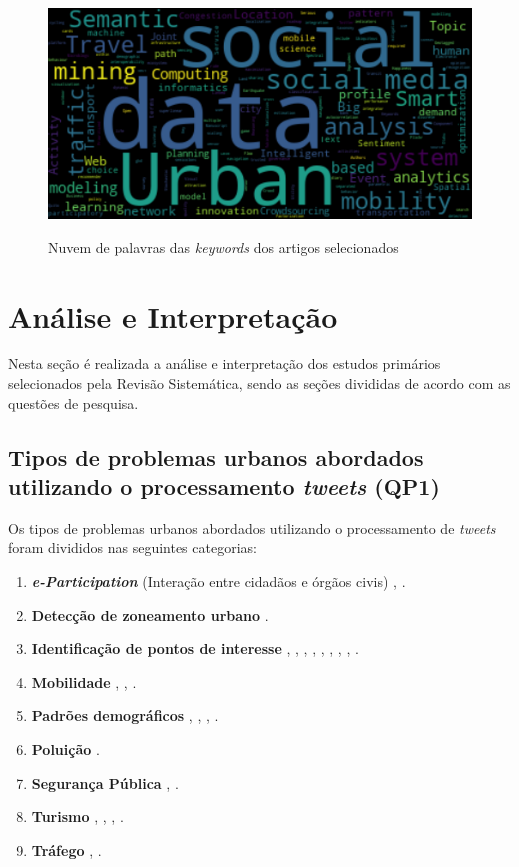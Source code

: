 \documentclass[
	12pt,				%
	oneside,			%
	a4paper,			%
	english,			%
	brazil				%
	]{abntex2ppgsi}
\begin{document}
{{\begin{figure}[H]%
	\centering
 	  \caption{Nuvem de palavras das \textit{keywords} dos artigos selecionados}
		\includegraphics[width=0.8\linewidth]{images/world_cloud_metodologia.png}
	\label{fig:w_cloud}
\end{figure}

\section{Análise e Interpretação}
\label{analise}
Nesta seção é realizada a análise e interpretação dos estudos primários selecionados pela Revisão Sistemática, sendo as seções divididas de acordo com as questões de pesquisa.
\subsection{Tipos de problemas urbanos abordados utilizando o processamento \textit{tweets} (QP1)}

Os tipos de problemas urbanos abordados utilizando o processamento de \textit{tweets} foram divididos nas seguintes categorias: 

\begin{enumerate}
\item \textit{\textbf{e-Participation}} (Interação entre  cidadãos  e órgãos civis) \cite{Mukherjee2015}, \cite{Soomro2016}.
\item \textbf{Detecção de zoneamento urbano} \cite{Frias-Martinez2014}.
\item \textbf{Identificação de pontos de interesse} \cite{Farseev2015}, \cite{Gutev2016}, \cite{Bendler2014}, \cite{Abbasi2015}, \cite{Gkiotsalitis2015}, \cite{Gkiotsalitis2016}, \cite{Hasan2014}, \cite{Maghrebi2015}, \cite{DiLorenzo2013}.
\item \textbf{Mobilidade} \cite{Gutev2016}, \cite{Chen2016}, \cite{Yousaf2014}.
\item \textbf{Padrões demográficos} \cite{Farseev2015}, \cite{Gutev2016}, \cite{Steiger2015Census}, \cite{Guo2016}.
\item \textbf{Poluição} \cite{Zagal2016}.
\item \textbf{Segurança Pública} \cite{Wen2016}, \cite{Mata2015}.
\item \textbf{Turismo} \cite{Thomaz2016}, \cite{Abbasi2015}, \cite{Chua2016}, \cite{Sobolevsky2015}.
\item \textbf{Tráfego} \cite{Anantharam2015}, \cite{Lecue2014}.
\end{enumerate}

}}
\end{document}
